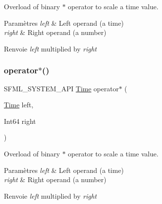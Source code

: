 Overload of binary $\ast$ operator to scale a time value. 


\begin{DoxyParams}{Paramètres}
{\em left} & Left operand (a time) \\
\hline
{\em right} & Right operand (a number)\\
\hline
\end{DoxyParams}
\begin{DoxyReturn}{Renvoie}
{\itshape left} multiplied by {\itshape right} 
\end{DoxyReturn}
\mbox{\label{classsf_1_1Time_acd021b3ebb108053d7dec56869e27385}} 
\subsubsection{\texorpdfstring{operator$\ast$()}{operator*()}\hspace{0.1cm}{\footnotesize\ttfamily [2/4]}}
{\footnotesize\ttfamily S\+F\+M\+L\+\_\+\+S\+Y\+S\+T\+E\+M\+\_\+\+A\+PI \hyperlink{classsf_1_1Time}{Time} operator$\ast$ (\begin{DoxyParamCaption}\item[{\hyperlink{classsf_1_1Time}{Time}}]{left,  }\item[{Int64}]{right }\end{DoxyParamCaption})\hspace{0.3cm}{\ttfamily [related]}}



Overload of binary $\ast$ operator to scale a time value. 


\begin{DoxyParams}{Paramètres}
{\em left} & Left operand (a time) \\
\hline
{\em right} & Right operand (a number)\\
\hline
\end{DoxyParams}
\begin{DoxyReturn}{Renvoie}
{\itshape left} multiplied by {\itshape right} 
\end{DoxyReturn}
\mbox{\label{classsf_1_1Time_a63723c9e9c5ff6151377ec4350c6f36e}} 
